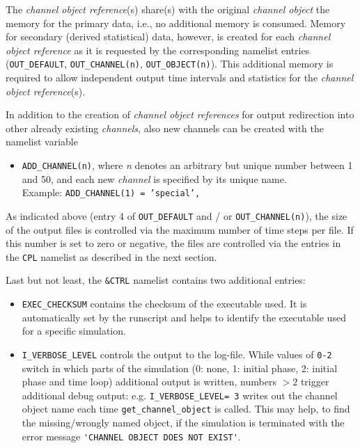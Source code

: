 \documentclass[twoside]{article}
\begin{document}
{The {\it channel object reference}(s) share(s)
with the original {\it channel object} the memory for the primary data,
i.e., no additional memory is consumed. Memory for secondary
(derived statistical) data, however, is created for each
{\it channel object reference} as it is requested by the corresponding
namelist entries
({\tt OUT\_DEFAULT}, {\tt OUT\_CHANNEL(n)}, {\tt OUT\_OBJECT(n)}).
This additional memory is required to allow independent output time intervals
and statistics for the {\it channel object reference}(s)}.

In addition to the creation of {\it channel object references} for
output redirection into other already existing {\it channels},
also new channels can be created with the namelist variable
%
\begin{itemize}
 \item {\tt ADD\_CHANNEL(n)}, where {\it n} denotes an arbitrary but unique
 number between 1 and 50, and each new {\it channel} is specified by its
 unique name.\\
 Example: {\tt ADD\_CHANNEL(1) = 'special',}
\end{itemize}

As indicated above
(entry 4 of {\tt OUT\_DEFAULT} and / or {\tt OUT\_CHANNEL(n)}),
the size of the output files is controlled via the maximum
number of time steps per file.
If this number is set to zero or
negative, the files are controlled via the entries in the {\tt CPL} namelist
as described in the next section.

Last but not least, the {\tt \&CTRL} namelist contains two additional entries:
\begin{itemize}
\item {\tt EXEC\_CHECKSUM} contains the checksum of the executable used. It is
  automatically set by the runscript and helps to identify the
  executable used for a specific simulation.
\item {\tt I\_VERBOSE\_LEVEL} controls the output to the log-file. While
  values of \verb|0-2| switch in which parts of the simulation (0: none, 1:
  initial phase, 2: initial phase and time loop) additional output is written,
  numbers $>2$ trigger additional debug output: e.g. \verb|I_VERBOSE_LEVEL= 3|
  writes out the channel object name each time \verb|get_channel_object| is
  called. This may help, to find the missing/wrongly named object, if the
  simulation is terminated with the error message
  \verb|'CHANNEL OBJECT DOES NOT EXIST'|.
\end{itemize}
\end{document}
